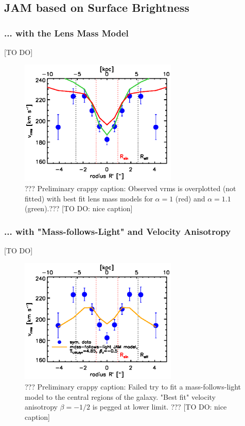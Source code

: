 \subsection{JAM based on Surface Brightness}

\subsubsection{... with the Lens Mass Model}

[TO DO]


\begin{figure}
  \centering
  \includegraphics[height=6cm]{fig/lensing_JAM_comparision.ps}
  \caption{??? Preliminary crappy caption: Observed vrms is overplotted (not fitted) with best fit lens mass models for $\alpha = 1$ (red) and $\alpha = 1.1$ (green).??? [TO DO: nice caption]}
  \label{fig:???}
\end{figure}



\subsubsection{... with "Mass-follows-Light" and Velocity Anisotropy}

[TO DO]


\begin{figure}
  \centering
  \includegraphics[height=6cm]{fig/jam_A2_vrms.ps}
  \caption{??? Preliminary crappy caption: Failed try to fit a mass-follows-light model to the central regions of the galaxy. "Best fit" velocity anisotropy $\beta = -1/2$ is pegged at lower limit. ??? [TO DO: nice caption]}
  \label{fig:???}
\end{figure}

